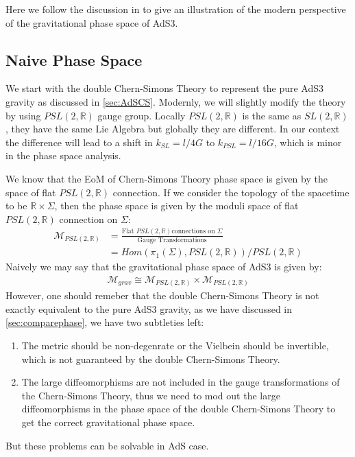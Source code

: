 Here we follow the discussion in
\cite{eberhardtOffshellPartitionFunctions2022} to give an
illustration of the modern perspective of the gravitational phase space of AdS3.

\subsection{Naive Phase Space}

We start with the double Chern-Simons Theory to represent the pure
AdS3 gravity as discussed in \cref{sec:AdSCS}. Modernly, we will
slightly modify the theory by using $ PSL(2,\mathbb{R}) $ gauge
group. Locally $ PSL(2,\mathbb{R}) $ is the same as $
SL(2,\mathbb{R}) $, they have the same Lie Algebra
but globally they are different. In our context the difference will
lead to a shift in $ k_{SL} = l/4G $ to $ k_{PSL} = l/16G $, which is
minor in the phase space analysis.

We know that the EoM of Chern-Simons Theory phase space is given by
the space of flat $ PSL(2,\mathbb{R}) $ connection. If we consider
the topology of the spacetime to be $ \mathbb{R} \times \Sigma $,
then the phase space is given by the moduli space of flat $
PSL(2,\mathbb{R}) $ connection on $ \Sigma $:
\begin{align}
  \mathcal{M}_{PSL(2,\mathbb{R})} &= \frac{\text{Flat } PSL(2,\mathbb{R}) \text{
  connections on } \Sigma}{\text{Gauge Transformations}} \\
  &= Hom(\pi_1(\Sigma), PSL(2,\mathbb{R}))/PSL(2,\mathbb{R})
\end{align}
Naively we may say that the gravitational phase space of AdS3 is given by:
\begin{align}
  \mathcal{M}_{grav} \cong \mathcal{M}_{PSL(2,\mathbb{R})} \times
  \mathcal{M}_{PSL(2,\mathbb{R})}
\end{align}
However, one should remeber that the double Chern-Simons Theory is
not exactly equivalent to the pure AdS3 gravity, as we have discussed
in \cref{sec:comparephase}, we have two subtleties left:
\begin{enumerate}
  \item The metric should be non-degenrate or the Vielbein should be
    invertible, which is not guaranteed by the
    double Chern-Simons Theory.
  \item The large diffeomorphisms are not included in the gauge
    transformations of the Chern-Simons Theory, thus we need to mod
    out the large
    diffeomorphisms in the phase space of the double Chern-Simons
    Theory to get the correct gravitational phase space.
\end{enumerate}
But these problems can be solvable in AdS case.

